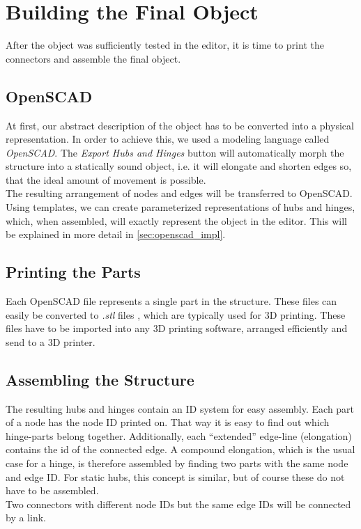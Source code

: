 \section{Building the Final Object}
After the object was sufficiently tested in the editor, it is time to print the connectors and assemble the final object.
\subsection{OpenSCAD}
At first, our abstract description of the object has to be converted into a physical representation. In order to achieve this, we used a modeling language called \textit{OpenSCAD}. The \textit{Export Hubs and Hinges} button will automatically morph the structure into a statically sound object, i.e. it will elongate and shorten edges so, that the ideal amount of movement is possible. \\
The resulting arrangement of nodes and edges will be transferred to OpenSCAD. Using templates, we can create parameterized representations of hubs and hinges, which, when assembled, will exactly represent the object in the editor. This will be explained in more detail in \ref{sec:openscad_impl}.
\subsection{Printing the Parts}
Each OpenSCAD file represents a single part in the structure. These files can easily be converted to \textit{.stl} files , which are typically used for 3D printing. These files have to be imported into any 3D printing software, arranged efficiently and send to a 3D printer. 
\subsection{Assembling the Structure}
The resulting hubs and hinges contain an ID system for easy assembly. Each part of a node has the node ID printed on. That way it is easy to find out which hinge-parts belong together. Additionally, each ``extended'' edge-line (elongation)  contains the id of the connected edge. A compound elongation, which is the usual case for a hinge, is therefore assembled by finding two parts with the same node and edge ID. For static hubs, this concept is similar, but of course these do not have to be assembled.\\
Two connectors with different node IDs but the same edge IDs will be connected by a link.
